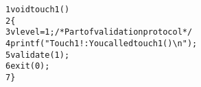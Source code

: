 \begin{alltt}
{\scriptsize   1} void touch1()
{\scriptsize   2} \verb:{:
{\scriptsize   3}     vlevel = 1;       /* Part of validation protocol */
{\scriptsize   4}     printf("Touch1!: You called touch1()\verb:\n:");
{\scriptsize   5}     validate(1);
{\scriptsize   6}     exit(0);
{\scriptsize   7} \verb:}:
\end{alltt}
